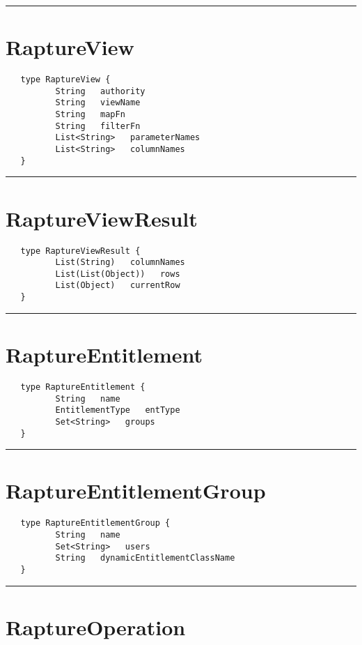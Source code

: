 \rule{15cm}{2pt}
\section{RaptureView}
\label{type:RaptureView}

\begin{verbatim}
   type RaptureView {
          String   authority
          String   viewName
          String   mapFn
          String   filterFn
          List<String>   parameterNames
          List<String>   columnNames
   }
\end{verbatim}

\rule{15cm}{2pt}
\section{RaptureViewResult}
\label{type:RaptureViewResult}

\begin{verbatim}
   type RaptureViewResult {
          List(String)   columnNames
          List(List(Object))   rows
          List(Object)   currentRow
   }
\end{verbatim}

\rule{15cm}{2pt}
\section{RaptureEntitlement}
\label{type:RaptureEntitlement}

\begin{verbatim}
   type RaptureEntitlement {
          String   name
          EntitlementType   entType
          Set<String>   groups
   }
\end{verbatim}

\rule{15cm}{2pt}
\section{RaptureEntitlementGroup}
\label{type:RaptureEntitlementGroup}

\begin{verbatim}
   type RaptureEntitlementGroup {
          String   name
          Set<String>   users
          String   dynamicEntitlementClassName
   }
\end{verbatim}

\rule{15cm}{2pt}
\section{RaptureOperation}
\label{type:RaptureOperation}

